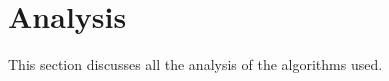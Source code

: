 \section{Analysis}
\label{sec:analysis}

This section discusses all the analysis of the algorithms used.